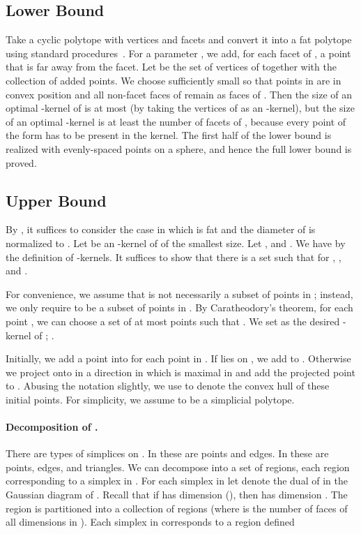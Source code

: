 \documentclass[11pt]{myclass}
\begin{document}
\subsection{Lower Bound}
Take a cyclic polytope with  vertices and  facets and convert it into a fat polytope  using standard procedures~\cite{AHV04}.  For a parameter , we add, for each facet  of , a point  that is  far away from the facet. Let  be the set of vertices of  together with the collection of added points. We choose  sufficiently small so that points in  are in convex position and all non-facet faces of  remain as faces of . Then the size of an optimal -kernel of  is at most  (by taking the vertices of  as an -kernel), but the size of an optimal -kernel is at least the number of facets of , because every point of the form  has to be present in the kernel. 
The first half of the lower bound is realized with  evenly-spaced points on a sphere, and hence the full lower bound is proved. 



\subsection{Upper Bound}
By \cite{AHV04}, it suffices to consider the case in which  is fat and the diameter of  is normalized to .  
Let  be an -kernel of  of the smallest size.  
Let , and  .  We have  by the definition of -kernels. It suffices to show that there is a set  such that for , , and  \cite{AHV04}.

For convenience, we assume that  is not necessarily a subset of points in ; instead, we only require  to be a subset of points in . By Caratheodory's theorem, for each point , we can choose a set  of at most  points such that .  We set  as the desired -kernel of ; .

Initially, we add a point into  for each point in .  If  lies on , we add  to .  Otherwise we project  onto  in a direction in which  is maximal in  and add the projected point to .  Abusing the notation slightly, we use  to denote the convex hull of these initial points.  
For simplicity, we assume  to be a simplicial polytope. 


\paragraph{Decomposition of .}
There are  types of simplices on .  In  these are points and edges.  In  these are points, edges, and triangles.  We can decompose  into a set of regions, each region  corresponding to a simplex  in .  For each simplex  in  let  denote the dual of  in the Gaussian diagram of .  
Recall that if  has dimension  (), then  has dimension .  
The region  is partitioned into a collection of  regions (where  is the number of faces of all dimensions in ).  Each simplex  in  corresponds to a region defined
\end{document}
